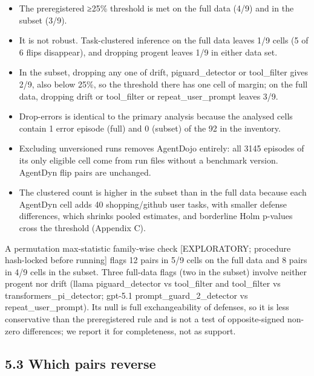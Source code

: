 \documentclass[11pt]{article}
\providecommand{\tightlist}{\setlength{\itemsep}{0pt}\setlength{\parskip}{0pt}}
\begin{document}
\begin{itemize}
\tightlist
\item
  The preregistered ≥25\% threshold is met on the full data (4/9) and in the subset (3/9).
\item
  It is not robust. Task-clustered inference on the full data leaves 1/9 cells (5 of 6 flips disappear), and dropping progent leaves 1/9 in either data set.
\item
  In the subset, dropping any one of drift, piguard\_detector or tool\_filter gives 2/9, also below 25\%, so the threshold there has one cell of margin; on the full data, dropping drift or tool\_filter or repeat\_user\_prompt leaves 3/9.
\item
  Drop-errors is identical to the primary analysis because the analysed cells contain 1 error episode (full) and 0 (subset) of the 92 in the inventory.
\item
  Excluding unversioned runs removes AgentDojo entirely: all 3145 episodes of its only eligible cell come from run files without a benchmark version. AgentDyn flip pairs are unchanged.
\item
  The clustered count is higher in the subset than in the full data because each AgentDyn cell adds 40 shopping/github user tasks, with smaller defense differences, which shrinks pooled estimates, and borderline Holm p-values cross the threshold (Appendix C).
\end{itemize}

A permutation max-statistic family-wise check {[}EXPLORATORY; procedure hash-locked before running{]} flags 12 pairs in 5/9 cells on the full data and 8 pairs in 4/9 cells in the subset. Three full-data flags (two in the subset) involve neither progent nor drift (llama piguard\_detector vs tool\_filter and tool\_filter vs transformers\_pi\_detector; gpt-5.1 prompt\_guard\_2\_detector vs repeat\_user\_prompt). Its null is full exchangeability of defenses, so it is less conservative than the preregistered rule and is not a test of opposite-signed non-zero differences; we report it for completeness, not as support.

\subsection{5.3 Which pairs reverse}\label{which-pairs-reverse}
\end{document}

